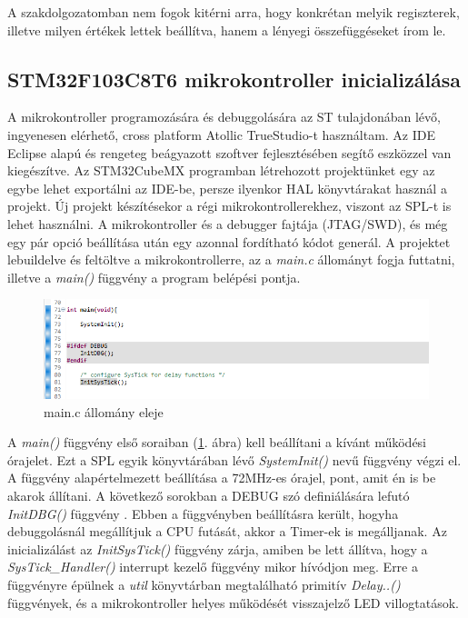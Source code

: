 \documentclass[../main.tex]{subfiles}
\begin{document}
        A szakdolgozatomban nem fogok kitérni arra, hogy konkrétan melyik regiszterek, illetve milyen értékek lettek beállítva, hanem a lényegi összefüggéseket írom le.
    
    \subsection{STM32F103C8T6 mikrokontroller inicializálása}
        A mikrokontroller programozására és debuggolására az ST tulajdonában lévő, ingyenesen elérhető, cross platform Atollic TrueStudio-t használtam. Az IDE Eclipse alapú és rengeteg beágyazott szoftver fejlesztésében segítő eszközzel van kiegészítve. Az STM32CubeMX programban létrehozott projektünket egy az egybe lehet exportálni az IDE-be, persze ilyenkor HAL könyvtárakat használ a projekt.
        Új projekt készítésekor a régi mikrokontrollerekhez, viszont az SPL-t is lehet használni. A mikrokontroller és a debugger fajtája (JTAG/SWD), és még egy pár opció beállítása után egy azonnal fordítható kódot generál.
        A projektet lebuildelve és feltöltve a mikrokontrollerre, az a \textit{main.c} állományt fogja futtatni, illetve a \textit{main()} függvény a program belépési pontja.
        
        \begin{figure}[h!]
            \centering
                \includegraphics[width=13cm]{resources/mbed_res/ps_main_init.png}
                \caption{main.c állomány eleje}
                \label{fig:ps_main_init}
        \end{figure}
        
        A \textit{main()} függvény első soraiban (\ref{fig:ps_main_init}. ábra) kell beállítani a kívánt működési órajelet. Ezt a SPL egyik könyvtárában lévő \textit{SystemInit()} nevű függvény végzi el. A függvény alapértelmezett beállítása a 72MHz-es órajel, pont, amit én is be akarok állítani. A következő sorokban a DEBUG szó definiálására lefutó \textit{InitDBG()} függvény \cite{peter_vass}. Ebben a függvényben beállításra került, hogyha debuggolásnál megállítjuk a CPU futását, akkor a Timer-ek is megálljanak. Az inicializálást az \textit{InitSysTick()} függvény zárja, amiben be lett állítva, hogy a \textit{SysTick_Handler()} interrupt kezelő függvény mikor hívódjon meg. Erre a függvényre épülnek a \textit{util} könyvtárban megtalálható primitív \textit{Delay..()} függvények, és a mikrokontroller helyes működését visszajelző LED villogtatások.
       
\end{document}
